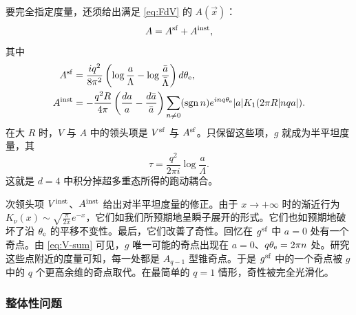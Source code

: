 要完全指定度量，还须给出满足 \eqref{eq:FdV} 的 $A(\vec{x})$：
\begin{equation}
A = A^{\mathrm{sf}} + A^{\mathrm{inst}},
\end{equation}
其中
\begin{align}
A^{\mathrm{sf}} &= \frac{i q^2}{8 \pi^2} \left( \log \frac{a}{\Lambda} - \log \frac{\bar{a}}{\bar{\Lambda}} \right) d\theta_{\mathrm{e}}, \label{eq:A0} \\
A^{\mathrm{inst}} &=  - \frac{q^2 R}{4 \pi} \left( \frac{da}{a} - \frac{d \bar a}{\bar a} \right) \sum_{n \neq 0} (\operatorname{sgn} n) e^{i n q \theta_{\mathrm{e}}} \lvert a \rvert K_1(2 \pi R \lvert n q a \rvert).  \label{eq:A-inst}
\end{align}
在大 $R$ 时，$V$ 与 $A$ 中的领头项是 $V^{\mathrm{sf}}$ 与 $A^{\mathrm{sf}}$。只保留这些项，$g$ 就成为半平坦度量，其
\begin{equation}
\tau = \frac{q^2}{2 \pi i} \log \frac{a}{\Lambda}.
\end{equation}
这就是 $d=4$ 中积分掉超多重态所得的跑动耦合。

次领头项 $V^{\mathrm{inst}}$、$A^{\mathrm{inst}}$ 给出对半平坦度量的修正。由于 $x \to +\infty$ 时的渐近行为 $K_\nu(x) \sim \sqrt{\frac{\pi}{2x}} e^{-x}$，它们如我们所预期地呈瞬子展开的形式。它们也如预期地破坏了沿 $\theta_{\mathrm{e}}$ 的平移不变性。最后，它们改善了奇性。回忆在 $g^{\mathrm{sf}}$ 中 $a=0$ 处有一个奇点。由 \eqref{eq:V-sum} 可见，$g$ 唯一可能的奇点出现在 $a = 0$、$q \theta_{\mathrm{e}} = 2 \pi n$ 处。研究这些点附近的度量可知，每一处都是 $A_{q-1}$ 型锥奇点。于是 $g^{\mathrm{sf}}$ 中的一个奇点被 $g$ 中的 $q$ 个更高余维的奇点取代。在最简单的 $q=1$ 情形，奇性被完全光滑化。

\subsubsection*{整体性问题}

